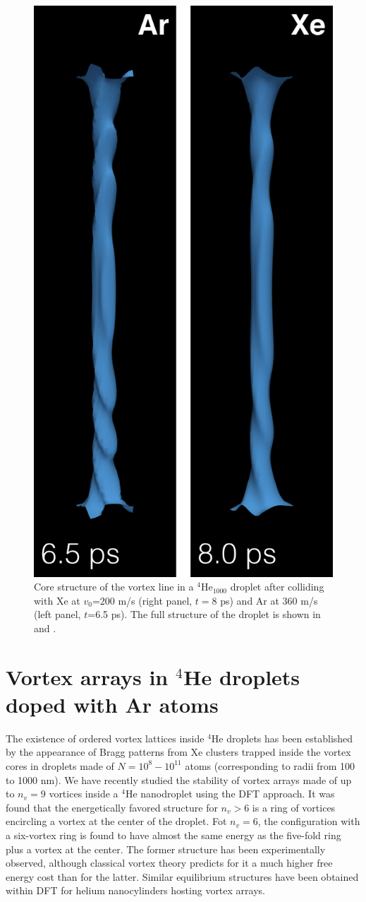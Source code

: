 \begin{figure}[h]
\centerline{\includegraphics[width=0.60\linewidth,clip]{fig12}}
\caption{\label{fig12-capture} 
Core structure of the vortex line in a $^4$He$_{1000}$ droplet after colliding  with  Xe at $v_0$=200 m/s (right panel, $t= 8$ ps) and Ar at 360 m/s (left panel, $t$=6.5 ps). 
The  full structure of the droplet is shown in  and .
}
\end{figure}
  
\section{Vortex arrays in $^4$He droplets doped with Ar atoms}

The existence of ordered vortex lattices inside $^4$He droplets has been established  by the appearance of Bragg patterns from 
Xe clusters trapped inside the vortex cores  in droplets made of $N= 10^8 - 10^{11}$ atoms
(corresponding to radii from 100 to 1000 nm)\citep{Gom14,Jones2016}. We have 
recently studied the stability of vortex 
arrays made of up to $n_v=9$ vortices
inside a $^4$He nanodroplet using the DFT approach\citep{Anc15}.  
It was found that 
the energetically favored structure for $n_v > 6$ is a ring 
of vortices encircling a vortex at the center of the droplet.
Fot $n_v=6$,  the 
configuration with a six-vortex ring is found to have almost 
the same energy as the five-fold ring
plus a vortex at the center. The former structure 
has been experimentally observed\citep{Gom14,Jones2016,Ber17}, 
although classical vortex theory 
predicts for it a much higher free energy cost than for the latter\citep{Cam79}.
Similar equilibrium structures have been obtained within DFT for
helium nanocylinders hosting vortex arrays\citep{Anc14}.

